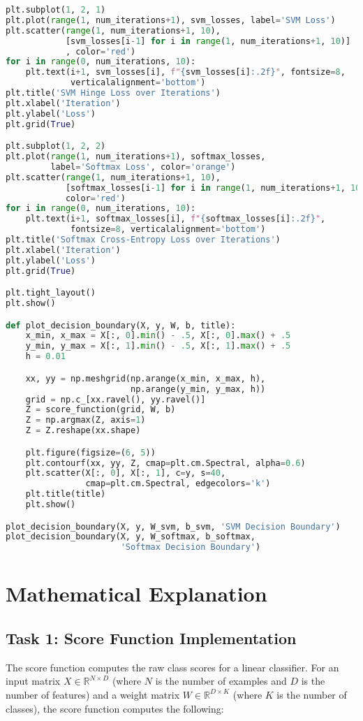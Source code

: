\documentclass{article}
\begin{document}
\begin{lstlisting}[language=Python]
plt.subplot(1, 2, 1)
plt.plot(range(1, num_iterations+1), svm_losses, label='SVM Loss')
plt.scatter(range(1, num_iterations+1, 10),
            [svm_losses[i-1] for i in range(1, num_iterations+1, 10)]
            , color='red')
for i in range(0, num_iterations, 10):
    plt.text(i+1, svm_losses[i], f"{svm_losses[i]:.2f}", fontsize=8, 
             verticalalignment='bottom')
plt.title('SVM Hinge Loss over Iterations')
plt.xlabel('Iteration')
plt.ylabel('Loss')
plt.grid(True)

plt.subplot(1, 2, 2)
plt.plot(range(1, num_iterations+1), softmax_losses, 
         label='Softmax Loss', color='orange')
plt.scatter(range(1, num_iterations+1, 10), 
            [softmax_losses[i-1] for i in range(1, num_iterations+1, 10)], 
            color='red')
for i in range(0, num_iterations, 10):
    plt.text(i+1, softmax_losses[i], f"{softmax_losses[i]:.2f}",
             fontsize=8, verticalalignment='bottom')
plt.title('Softmax Cross-Entropy Loss over Iterations')
plt.xlabel('Iteration')
plt.ylabel('Loss')
plt.grid(True)

plt.tight_layout()
plt.show()

def plot_decision_boundary(X, y, W, b, title):
    x_min, x_max = X[:, 0].min() - .5, X[:, 0].max() + .5
    y_min, y_max = X[:, 1].min() - .5, X[:, 1].max() + .5
    h = 0.01 

    xx, yy = np.meshgrid(np.arange(x_min, x_max, h),
                         np.arange(y_min, y_max, h))
    grid = np.c_[xx.ravel(), yy.ravel()]
    Z = score_function(grid, W, b)
    Z = np.argmax(Z, axis=1)
    Z = Z.reshape(xx.shape)

    plt.figure(figsize=(6, 5))
    plt.contourf(xx, yy, Z, cmap=plt.cm.Spectral, alpha=0.6)
    plt.scatter(X[:, 0], X[:, 1], c=y, s=40,
                cmap=plt.cm.Spectral, edgecolors='k')
    plt.title(title)
    plt.show()

plot_decision_boundary(X, y, W_svm, b_svm, 'SVM Decision Boundary')
plot_decision_boundary(X, y, W_softmax, b_softmax,
                       'Softmax Decision Boundary')
\end{lstlisting}

\section{Mathematical Explanation}

\subsection{Task 1: Score Function Implementation}
The score function computes the raw class scores for a linear classifier. For an input matrix $X \in \mathbb{R}^{N \times D}$ (where $N$ is the number of examples and $D$ is the number of features) and a weight matrix $W \in \mathbb{R}^{D \times K}$ (where $K$ is the number of classes), the score function computes the following:
\end{document}
